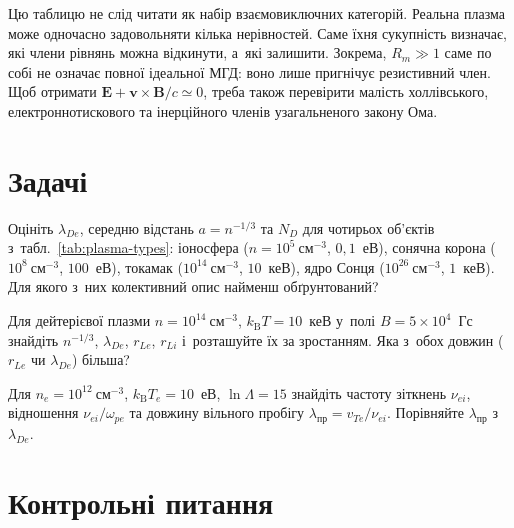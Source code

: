Цю таблицю не слід читати як набір взаємовиключних категорій. Реальна плазма може
одночасно задовольняти кілька нерівностей. Саме їхня сукупність визначає, які члени
рівнянь можна відкинути, а~які залишити. Зокрема, $R_m\gg1$ саме по собі не означає повної
ідеальної МГД: воно лише пригнічує резистивний член. Щоб отримати $\mathbf E+\mathbf
v\times\mathbf B/c\simeq0$, треба також перевірити малість холлівського,
електроннотискового та інерційного членів узагальненого закону Ома.





\section*{Задачі}

\begin{problem}\label{prb:PlasmaTable}
	Оцініть $\lambda_{De}$, середню відстань $a=n^{-1/3}$ та $N_D$ для чотирьох об'єктів
	з~табл.~\ref{tab:plasma-types}: іоносфера ($n=10^5~\mathrm{см}^{-3}$, $0{,}1$~еВ),
	сонячна корона ($10^8~\mathrm{см}^{-3}$, $100$~еВ), токамак
	($10^{14}~\mathrm{см}^{-3}$, $10$~кеВ), ядро Сонця ($10^{26}~\mathrm{см}^{-3}$,
	$1$~кеВ). Для якого з~них колективний опис найменш обґрунтований?
\end{problem}

\begin{problem}\label{prb:PlasmaScales}
	Для дейтерієвої плазми $n=10^{14}~\mathrm{см}^{-3}$, $k_{\mathrm B}T=10$~кеВ у~полі
	$B=5\times10^4$~Гс знайдіть $n^{-1/3}$, $\lambda_{De}$, $r_{Le}$, $r_{Li}$
	і~розташуйте їх за зростанням. Яка з~обох довжин ($r_{Le}$ чи $\lambda_{De}$) більша?
\end{problem}

\begin{problem}\label{prb:PlasmaCollisions}
	Для $n_e=10^{12}~\mathrm{см}^{-3}$, $k_{\mathrm B}T_e=10$~еВ, $\ln\Lambda=15$ знайдіть
	частоту зіткнень $\nu_{ei}$, відношення $\nu_{ei}/\omega_{pe}$ та довжину вільного
	пробігу $\lambda_{\mathrm{пр}}=v_{Te}/\nu_{ei}$. Порівняйте $\lambda_{\mathrm{пр}}$
	з~$\lambda_{De}$.
\end{problem}

\section*{Контрольні питання}


